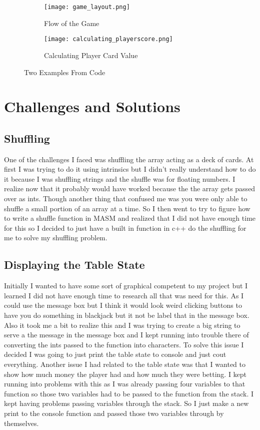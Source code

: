 \documentclass[twoside]{article}
\begin{document}
\begin{figure}[h]
\begin{subfigure}{0.6\textwidth}
\texttt{[image: game\_layout.png]} 
\caption{Flow of the Game}
\label{fig:subim1}
\end{subfigure}
\begin{subfigure}{0.6\textwidth}
\texttt{[image: calculating\_playerscore.png]}
\caption{Calculating Player Card Value}
\label{fig:subim2}
\end{subfigure}
\caption{Two Examples From Code}
\label{fig:image2}
\end{figure}

\section{Challenges and Solutions}
\subsection{Shuffling}
One of the challenges I faced was shuffling the array acting as a deck of cards. At first I was trying to do it using intrinsics but I didn't really understand how to do it because I was shuffling strings and the shuffle was for floating numbers. I realize now that it probably would have worked because the the array gets passed over as ints. Though another thing that confused me was you were only able to shuffle a small portion of an array at a time. So I then went to try to figure how to write a shuffle function in MASM and realized that I did not have enough time for this so I decided to just have a built in function in c++ do the shuffling for me to solve my shuffling problem.

\subsection{Displaying the Table State}
Initially I wanted to have some sort of graphical competent to my project but I learned I did not have enough time to research all that was need for this. As I could use the message box but I think it would look weird clicking buttons to have you do something in blackjack but it not be label that in the message box. Also it took me a bit to realize this and I was trying to create a big string to serve a the message in the message box and I kept running into trouble there of converting the ints passed to the function into characters. To solve this issue I decided I was going to just print the table state to console and just cout everything. Another issue I had related to the table state was that I wanted to show how much money the player had and how much they were betting. I kept running into problems with this as I was already passing four variables to that function so those two variables had to be passed to the function from the stack. I kept having problems passing variables through the stack. So I just make a new print to the console function and passed those two variables through by themselves.
\end{document}
